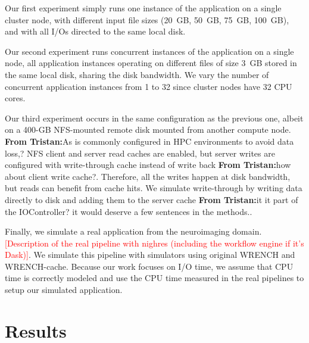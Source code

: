 \documentclass[conference]{IEEEtran}
\newcommand{\tristan}[1]{\color{orange}\textbf{From Tristan:}#1\color{black}}
\begin{document}

            Our first experiment simply runs one instance of the
            application on a single cluster node, with different input file
            sizes (20~GB, 50~GB, 75~GB, 100~GB), and with all I/Os directed
            to the same local disk.

            Our second experiment runs concurrent instances of the
            application on a single node, all application instances
            operating on different files of size 3~GB stored in the same
            local disk, sharing the disk bandwidth. We vary the number of
            concurrent application instances from 1 to 32 since cluster
            nodes have 32 CPU cores.

            Our third experiment occurs in the same configuration as the
            previous one, albeit on a 400-GB NFS-mounted remote disk
            mounted from another compute node. \tristan{As is commonly
            configured in HPC environments to avoid data loss,?} NFS client
            and server read caches are enabled, but server writes are configured with
            write-through cache instead of write back \tristan{how about client write
            cache?}. Therefore, all the writes happen at disk bandwidth, but
            reads can benefit from cache hits. We simulate write-through by
            writing data directly to disk and adding them to the server
            cache \tristan{it it part of the IOController? it would deserve
            a few sentences in the methods.}.

            Finally, we simulate a real application from the neuroimaging
            domain. \textcolor{red}{[Description of the real pipeline with
            nighres (including the workflow engine if it's Dask)]}.
            We simulate this pipeline with simulators using original WRENCH
            and WRENCH-cache. Because our work focuses on I/O time, we
            assume that CPU time is correctly modeled and use the CPU time
            measured in the real pipelines to setup our simulated
            application.

    \section{Results}
    \label{results}
\end{document}

